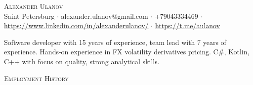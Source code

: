 \documentclass[a4paper]{article}
\newcommand{\lineunder} {
    \vspace*{-8pt} \\
    \hspace*{-18pt} \hrulefill \\
}
\newcommand{\header} [1] {
    {\hspace*{-18pt}\vspace*{6pt} \textsc{#1}}
    \vspace*{-6pt} \lineunder
}
\begin{document}
\vspace*{-40pt}

    

\vspace*{-10pt}
\begin{center}
	{\Huge \scshape {Alexander Ulanov}}\\
	Saint Petersburg $\cdot$ alexander.ulanov@gmail.com $\cdot$ +79043334469 $\cdot$ \url{https://www.linkedin.com/in/alexanderulanov/} $\cdot$ \url{https://t.me/aulanov}\\
\end{center}

Software developer with 15 years of experience, team lead with 7 years of experience. Hands-on experience in FX volatility derivatives pricing. C\#, Kotlin, C++ with focus on quality, strong analytical skills.

\vspace{3mm}
\header{Employment History}
\vspace{1mm}
\end{document}
